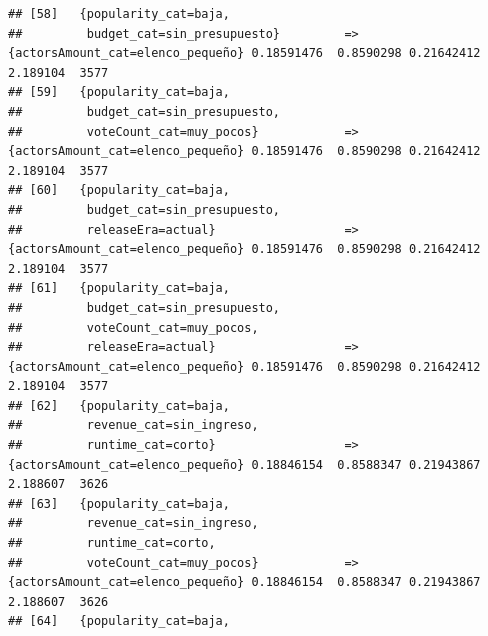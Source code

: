 \documentclass[
]{article}
\begin{document}
\begin{verbatim}
## [58]   {popularity_cat=baja,                                                                                                    
##         budget_cat=sin_presupuesto}         => {actorsAmount_cat=elenco_pequeño} 0.18591476  0.8590298 0.21642412 2.189104  3577
## [59]   {popularity_cat=baja,                                                                                                    
##         budget_cat=sin_presupuesto,                                                                                             
##         voteCount_cat=muy_pocos}            => {actorsAmount_cat=elenco_pequeño} 0.18591476  0.8590298 0.21642412 2.189104  3577
## [60]   {popularity_cat=baja,                                                                                                    
##         budget_cat=sin_presupuesto,                                                                                             
##         releaseEra=actual}                  => {actorsAmount_cat=elenco_pequeño} 0.18591476  0.8590298 0.21642412 2.189104  3577
## [61]   {popularity_cat=baja,                                                                                                    
##         budget_cat=sin_presupuesto,                                                                                             
##         voteCount_cat=muy_pocos,                                                                                                
##         releaseEra=actual}                  => {actorsAmount_cat=elenco_pequeño} 0.18591476  0.8590298 0.21642412 2.189104  3577
## [62]   {popularity_cat=baja,                                                                                                    
##         revenue_cat=sin_ingreso,                                                                                                
##         runtime_cat=corto}                  => {actorsAmount_cat=elenco_pequeño} 0.18846154  0.8588347 0.21943867 2.188607  3626
## [63]   {popularity_cat=baja,                                                                                                    
##         revenue_cat=sin_ingreso,                                                                                                
##         runtime_cat=corto,                                                                                                      
##         voteCount_cat=muy_pocos}            => {actorsAmount_cat=elenco_pequeño} 0.18846154  0.8588347 0.21943867 2.188607  3626
## [64]   {popularity_cat=baja,                                                                                                    

\end{verbatim}
\end{document}
